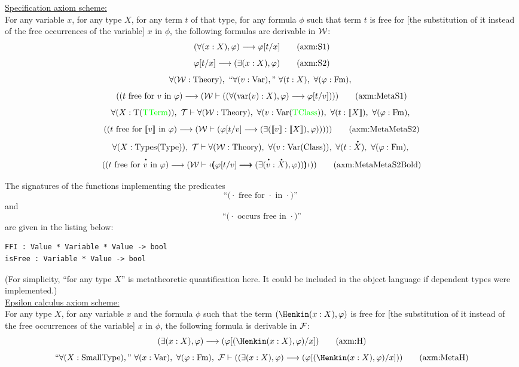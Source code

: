 \underline{Specification axiom scheme:}\\
For any variable $x$, for any type $X$, for any term $t$ of that type, for any formula $\phi$ such that term $t$ is free for [the substitution of it instead of the free occurrences of the variable] $x$ in $\phi$, the following formulas are derivable in ${\mathcal{W}}$:
\[
(\forall (x:X),\phi) \implies \phi[t/x]
\labeltagd{axm}{S1}
\]
\[
\phi[t/x] \implies (\exists (x:X),\phi)
\labeltagd{axm}{S2}
\]
\[
\forall (\Wau:\Theory),\ %
``\forall (v:\Var),"\ %
\forall (t:X),\ %
\forall (\phi:\Fm),\ %
\]
\[
(
(\text{$t$ free for $v$ in $\phi$})
\implies
(\Wau \vdash ((\forall (\text{var}(v):X),\phi) \implies \phi[t/v]))
)
\clabeltagd{axm}{MetaS1}
\]
\[
\forall (X:\text{T}(\TType)),\ %
\Tau \vdash 
\forall (\Wau:\Theory),\ %
\forall (v:\Var(\TClass)),\ %
\forall (t:\mantiquote{X}),\ %
\forall (\phi:\Fm),\ %
\]%
\[
(
(\text{$t$ free for $\mantiquote{v}$ in $\phi$})
\implies
(
\Wau \vdash \NOmquote{
(\NOmantiquote{\phi[t/v]}
\implies
(%
\exists (\mantiquote{v}:\mantiquote{X}),\NOmantiquote{\phi})
)
)
}
)
)
\clabeltagd{axm}{MetaMetaS2}
\]%
\[
\forall (X:\Types(\Type)),\ %
\Tau \vdash
\forall (\Wau:\Theory),\ %
\forall (v:\Var(\Class)),\ %
\forall (t:\meta{X}),\ %
\forall (\phi:\Fm),\ %
\]%
\[
(
(\text{$t$ free for $\meta{v}$ in $\phi$})
\implies
(
\Wau \vdash \mquote{
\pmb{(}
\NOmantiquote{\phi[t/v]}
\pmb{\implies}
(
\exists (\meta{v}:\meta{X}),{\phi})
)
\pmb{)}
}
)
)
\clabeltagd{axm}{MetaMetaS2Bold}
\]%
%
%

The signatures of the functions implementing the predicates 
\[\text{
``($\cdot$~free for~$\cdot$~in~$\cdot$)'' 
}\]
and 
\[\text{
``($\cdot$~occurs~free~in~$\cdot$)''
}\]
are given in the listing below:
\begin{lstlisting}
FFI : Value * Variable * Value -> bool
isFree : Variable * Value -> bool
\end{lstlisting}
(For simplicity, ``for any type $X$'' is metatheoretic quantification here. It could be included in the object language if dependent types were implemented.)\\
\underline{Epsilon calculus axiom scheme:}\\%
For any type $X$, for any variable $x$ and the formula $\phi$ such that the term $(\Henkin (x:X),\varphi)$ is free for [the substitution of it instead of the free occurrences of the variable] $x$ in $\phi$, the following formula is derivable in ${\mathcal{F}}$:
\[
(\exists (x:X),\varphi)
\implies
(\varphi[(\Henkin (x:X),\varphi)/x])
\labeltagd{axm}{H}
\]
\[
``\forall (X:\SmallType),"\ %
\forall (x:\Var),\ %
\forall (\phi:\Fm),\ %
\Fau\vdash
(
(\exists (x:X),\varphi)
\implies
(\varphi[(\Henkin (x:X),\varphi)/x])
)
\labeltagd{axm}{MetaH}
\]

